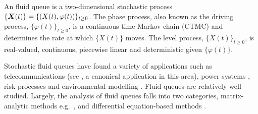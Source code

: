 		

An fluid queue is a two-dimensional stochastic process \(\{{\boldsymbol X}(t)\} = \{( X(t),\varphi(t))\}_{t\geq0}\). The phase process, also known as the driving process, \(\{\varphi(t)\}_{t\geq0}\), is a continuous-time Markov chain (CTMC) and determines the rate at which \(\{ X(t)\}\) moves. The level process, \(\{ X(t)\}_{t\geq0}\), is real-valued, continuous, piecewise linear and deterministic given \(\{\varphi(t)\}\). 
 
Stochastic fluid queues have found a variety of applications such as telecommunications (see \cite{anick1982}, a canonical application in this area), power systems \citep{hydro}, risk processes \citep{betal2005} and environmental modelling \citep{wurm2020}. Fluid queues are relatively well studied. Largely, the analysis of fluid queues falls into two categories, matrix-analytic methods e.g.~\cite{ajr2005,ar2003,ar2004,bean2005b,bean2005,bot08,bean2009,dasilva2005,latouche2018}, and differential equation-based methods \cite{anick1982,kk1995,blnos2022}. %

